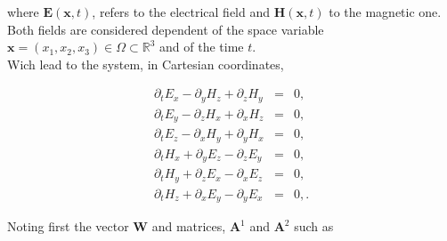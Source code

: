 \documentclass[a4paper,oneside,10pt]{report}
\begin{document}
 where $\mathbf{E}(\mathbf{x},t)$, refers to the electrical field and $\mathbf{H}(\mathbf{x},t)$ to the magnetic one. Both fields are considered dependent of the space variable  $\mathbf{x}=(x_1,x_2,x_3)\in \Omega \subset \mathbb{R}^3$ and of the time $t$.\\

Wich lead to the system, in Cartesian coordinates,

\begin{eqnarray}
\partial_t E_x - \partial_y H_z + \partial_z H_y    &=& 0, \label{eq:3a}\\
\partial_t E_y - \partial_z H_x + \partial_x H_z    &=& 0, \label{eq:3b}\\
\partial_t E_z - \partial_x H_y + \partial_y H_x    &=& 0, \label{eq:3c}\\
\partial_t H_x + \partial_y E_z - \partial_z E_y    &=& 0, \label{eq:3d}\\
\partial_t H_y + \partial_z E_x - \partial_x E_z    &=& 0, \label{eq:3e}\\
\partial_t H_z + \partial_x E_y - \partial_y E_x    &=& 0, \label{eq:3f}.
\end{eqnarray}


Noting first the vector $\mathbf{W}$ and matrices, $\mathbf{A}^1$ and $\mathbf{A}^2$ such as
\end{document}
